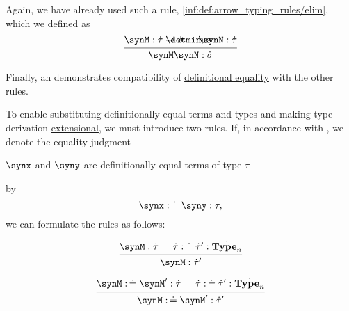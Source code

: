 \begin{remark}
\begin{thmenum}
    Again, we have already used such a rule, \ref{inf:def:arrow_typing_rules/elim}, which we defined as
    \begin{equation*}
      \begin{prooftree}
        \hypo{ \synM: \syn\tau \synimplies \syn\sigma }
        \hypo{ \synN: \syn\tau }
        \infer2{ \synM \synN: \syn\sigma }
      \end{prooftree}
    \end{equation*}

     Finally, an  demonstrates compatibility of \hyperref[con:equality]{definitional equality} with the other rules.

    To enable substituting definitionally equal terms and types and making type derivation \hyperref[con:extensionality]{extensional}, we must introduce two rules. If, in accordance with , we denote the equality judgment
    \begin{center}
      \( \synx \) and \( \syny \) are definitionally equal terms of type \( \tau \)
    \end{center}
    by
    \begin{equation*}
      \synx \syncoloneqq \syny: \tau,
    \end{equation*}
    we can formulate the rules as follows:
    \begin{paracol}{2}
      \begin{leftcolumn}
        \phantom{alignment hack}
        \begin{equation*}
          \begin{prooftree}
            \hypo{ \synM: \syn\tau }
            \hypo{ \syn\tau \syncoloneqq \syn\tau': \syn{\op*{Type}_n} }
            \infer2{ \synM: \syn\tau' }
          \end{prooftree}
        \end{equation*}
      \end{leftcolumn}

      \begin{rightcolumn}
        \phantom{alignment hack}
        \begin{equation*}
          \begin{prooftree}
            \hypo{ \synM \syncoloneqq \synM': \syn\tau }
            \hypo{ \syn\tau \syncoloneqq \syn\tau': \syn{\op*{Type}_n} }
            \infer2{ \synM \syncoloneqq \synM': \syn\tau' }
          \end{prooftree}
        \end{equation*}
      \end{rightcolumn}
    \end{paracol}


\end{thmenum}
\end{remark}
